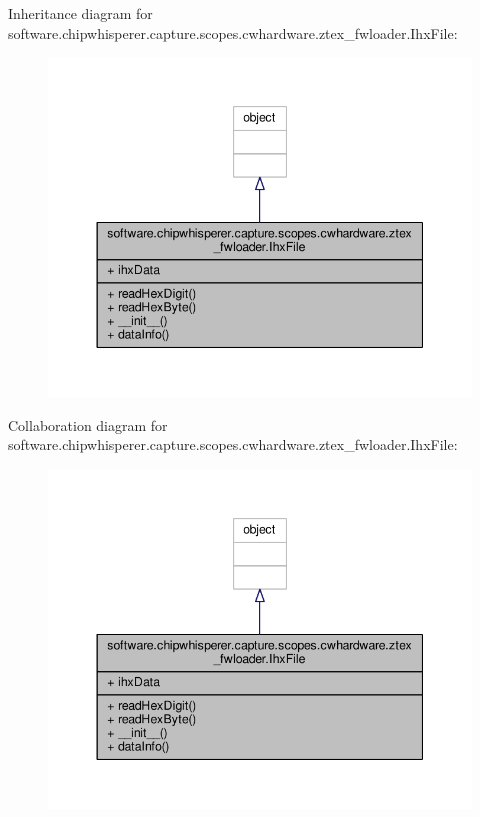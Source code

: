 Inheritance diagram for software.\+chipwhisperer.\+capture.\+scopes.\+cwhardware.\+ztex\+\_\+fwloader.\+Ihx\+File\+:\nopagebreak
\begin{figure}[H]
\begin{center}
\leavevmode
\includegraphics[width=344pt]{d0/df8/classsoftware_1_1chipwhisperer_1_1capture_1_1scopes_1_1cwhardware_1_1ztex__fwloader_1_1IhxFile__inherit__graph}
\end{center}
\end{figure}


Collaboration diagram for software.\+chipwhisperer.\+capture.\+scopes.\+cwhardware.\+ztex\+\_\+fwloader.\+Ihx\+File\+:\nopagebreak
\begin{figure}[H]
\begin{center}
\leavevmode
\includegraphics[width=344pt]{d6/d54/classsoftware_1_1chipwhisperer_1_1capture_1_1scopes_1_1cwhardware_1_1ztex__fwloader_1_1IhxFile__coll__graph}
\end{center}
\end{figure}


